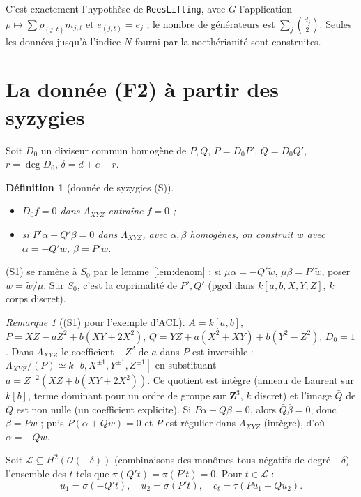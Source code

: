 \documentclass[11pt]{amsart}
\newtheorem{definition}[proposition]{Définition}
\theoremstyle{remark}
\newtheorem{remark}[proposition]{Remarque}
\newcommand{\La}{\Lambda}
\begin{document}
C'est exactement l'hypothèse de \texttt{ReesLifting}, avec $G$ l'application
$\rho\mapsto\sum\rho_{(j,t)}m_{j,t}$ et $e_{(j,t)}=e_j$ ; le nombre de
générateurs est $\sum_j\binom{d_j}{2}$. Seules les données jusqu'à
l'indice $N$ fourni par la noethérianité sont construites.

\section{La donnée (F2) à partir des syzygies}\label{sec:F2}

Soit $D_0$ un diviseur commun homogène de $P,Q$, $P=D_0P'$,
$Q=D_0Q'$, $r=\deg D_0$, $\delta=d+e-r$.

\begin{definition}[donnée de syzygies (S)]
\begin{itemize}
\item[(S0)] $D_0f=0$ dans $\La_{XYZ}$ entraîne $f=0$ ;
\item[(S1)] si $P'\alpha+Q'\beta=0$ dans $\La_{XYZ}$, avec $\alpha,\beta$
  homogènes, on construit $w$ avec $\alpha=-Q'w$, $\beta=P'w$.
\end{itemize}
\end{definition}

(S1) se ramène à $S_0$ par le lemme~\ref{lem:denom} : si
$\mu\alpha=-Q'\tilde w$, $\mu\beta=P'\tilde w$, poser $w=\tilde w/\mu$.
Sur $S_0$, c'est la coprimalité de $P',Q'$ (pgcd dans
$k[a,b,X,Y,Z]$, $k$ corps discret).

\begin{remark}[(S1) pour l'exemple d'ACL]\label{rem:S1acl}
$A=k[a,b]$, $P=XZ-aZ^2+b(XY+2X^2)$, $Q=YZ+a(X^2+XY)+b(Y^2-Z^2)$, $D_0=1$.
Dans $\La_{XYZ}$ le coefficient $-Z^2$ de $a$ dans $P$ est inversible :
$\La_{XYZ}/(P)\simeq k[b,X^{\pm1},Y^{\pm1},Z^{\pm1}]$ en substituant
$a=Z^{-2}(XZ+b(XY+2X^2))$. Ce quotient est intègre (anneau de Laurent sur
$k[b]$, terme dominant pour un ordre de groupe sur $\mathbf Z^3$, $k$
discret) et l'image $\bar Q$ de $Q$ est non nulle (un coefficient
explicite). Si $P\alpha+Q\beta=0$, alors $\bar Q\bar\beta=0$, donc
$\beta=Pw$ ; puis $P(\alpha+Qw)=0$ et $P$ est régulier dans $\La_{XYZ}$
(intègre), d'où $\alpha=-Qw$.
\end{remark}

Soit $\mathcal L\subseteq H^2(\mathcal O(-\delta))$ (combinaisons des
monômes tous négatifs de degré $-\delta$) l'ensemble des $t$ tels que
$\pi(Q't)=\pi(P't)=0$. Pour $t\in\mathcal L$ :
\[
 u_1=\sigma(-Q't),\quad u_2=\sigma(P't),\quad c_t=\tau(Pu_1+Qu_2).
\]
\end{document}

